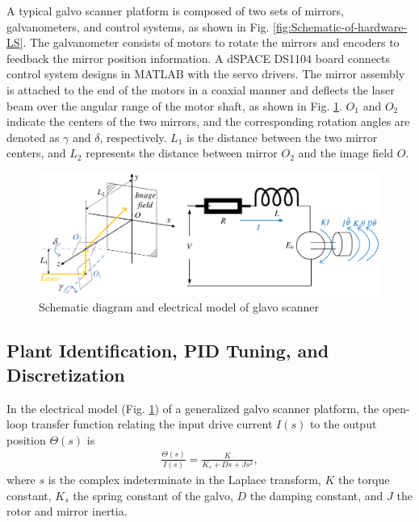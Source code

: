 \documentclass [11pt, proquest] {uwthesis}[2020/02/24]
\begin{document}
A typical galvo scanner platform is composed of two sets of mirrors,
galvanometers, and control systems, as shown in Fig. \ref{fig:Schematic-of-hardware-LS}. The galvanometer consists of motors to rotate the mirrors and encoders
to feedback the mirror position information. A dSPACE DS1104 board connects control system designs in MATLAB with the servo drivers. The mirror assembly is
attached to the end of the motors in a coaxial manner and deflects
the laser beam over the angular range of the motor shaft, as shown
in Fig. \ref{fig:Schematic-diagram-of-G}. $O_{1}$ and $O_{2}$ indicate
the centers of the two mirrors, and the corresponding rotation angles
are denoted as $\gamma$ and $\delta$, respectively. $L_{1}$ is
the distance between the two mirror centers, and $L_{2}$ represents
the distance between mirror $O_{2}$ and the image field $O$.
\begin{figure}[!ht]
\begin{centering}
\includegraphics[width=13cm]{Loop-shaping/Drawing1}
\par\end{centering}
\caption{\label{fig:Schematic-diagram-of-G}Schematic diagram and electrical
model of glavo scanner}
\end{figure}

\subsection{Plant Identification, PID Tuning, and Discretization}

In the electrical model (Fig. \ref{fig:Schematic-diagram-of-G}) of
a generalized galvo scanner platform, the open-loop transfer function
\cite{keane1994full,mirtchev2010optimizing} relating the input drive
current $I(s)$ to the output position $\varTheta(s)$ is
\begin{gather}
\frac{\varTheta(s)}{I(s)}=\frac{K}{K_{s}+Ds+Js^{2}},\label{eq:plant_model}
\end{gather}
where $s$ is the complex indeterminate in the Laplace transform, $K$ the torque constant, $K_{s}$ the spring constant
of the galvo, $D$ the damping constant, and $J$ the rotor
and mirror inertia.
\end{document}
